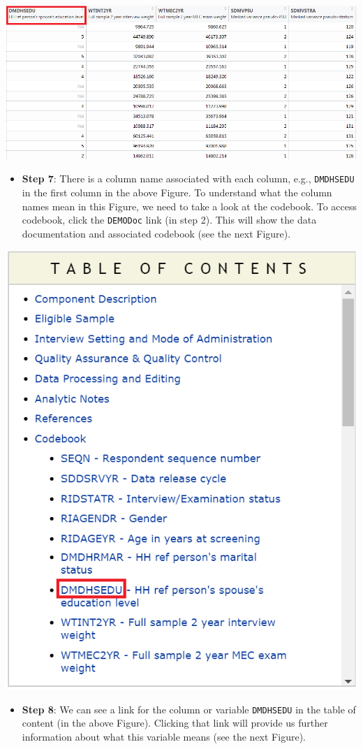 \documentclass[
]{book}
\providecommand{\tightlist}{%
  \setlength{\itemsep}{0pt}\setlength{\parskip}{0pt}}
\begin{document}
\includegraphics[width=0.65\linewidth]{images/dataview}

\begin{itemize}
\tightlist
\item
  \textbf{Step 7}: There is a column name associated with each column, e.g., \texttt{DMDHSEDU} in the first column in the above Figure. To understand what the column names mean in this Figure, we need to take a look at the codebook. To access codebook, click the \texttt{\textquotesingle{}DEMO\textbar{}Doc\textquotesingle{}} link (in step 2). This will show the data documentation and associated codebook (see the next Figure).
\end{itemize}

\includegraphics[width=0.65\linewidth]{images/toc}

\begin{itemize}
\tightlist
\item
  \textbf{Step 8}: We can see a link for the column or variable \texttt{DMDHSEDU} in the table of content (in the above Figure). Clicking that link will provide us further information about what this variable means (see the next Figure).
\end{itemize}
\end{document}
